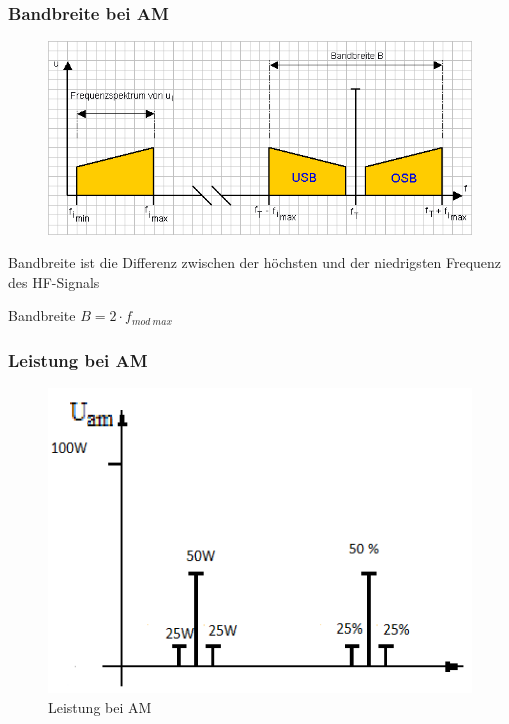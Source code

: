 \begin{frame}
\frametitle{Bandbreite bei AM}
\begin{center}
    \begin{figure}
      \includegraphics[width=.8\textwidth,height=.4\textheight,keepaspectratio]{e14/Bandbreite.png}
    \end{figure}
\end{center}
Bandbreite ist die Differenz zwischen der höchsten und der niedrigsten Frequenz des HF-Signals
\begin{block}{Bandbreite}
  {$B = 2 \cdot f_{mod~max}$}
\end{block}
\end{frame}

\begin{frame}
\frametitle{Leistung bei AM}
 \begin{figure}
    \includegraphics[width=\textwidth,height=.75\textheight,keepaspectratio]{e14/AMP.png}
    \caption{Leistung bei AM}
  \end{figure}
\end{frame}

